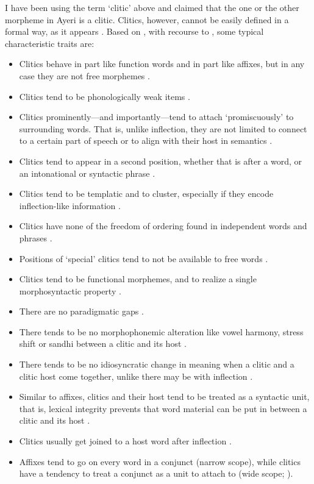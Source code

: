 I have been using the term `clitic' above and claimed that the one or the
other morpheme in Ayeri is a clitic. Clitics, however, cannot be easily defined
in a formal way, as it appears \citep[126]{spencerluis2012}. Based on
\citet{spencerluis2012}, with recourse to \citet{zwickypullum1983}, some
typical characteristic traits are:

\begin{itemize}
	\item Clitics behave in part like function words and in part like affixes, 
		but in any case they are not free morphemes 
		\citep[38, 42]{spencerluis2012}.
	\item Clitics tend to be phonologically weak items 
		\citep[39]{spencerluis2012}.
	\item Clitics prominently---and importantly---tend to attach 
		`promiscuously' to surrounding words. That is, unlike inflection, they 
		are not limited to connect to a certain part of speech or to align 
		with their host in semantics \citep[40, 108–109]{spencerluis2012}.
	\item Clitics tend to appear in a second position, whether that is after a 
		word, or an intonational or syntactic phrase 
		\citep[41]{spencerluis2012}.
	\item Clitics tend to be templatic and to cluster, especially if they 
		encode inflection-like information \citep[41, 47--48]{spencerluis2012}.
	\item Clitics have none of the freedom of ordering found in independent 
		words and phrases \citep[43]{spencerluis2012}.
	\item Positions of `special' clitics tend to not be available to free 
		words \citep[44]{spencerluis2012}.
	\item Clitics tend to be functional morphemes, and to realize a single 
		morphosyntactic property \citep[67, 179]{spencerluis2012}.
	\item There are no paradigmatic gaps \citep[108--109]{spencerluis2012}.
	\item There tends to be no morphophonemic alteration like vowel harmony, 
		stress shift or sandhi between a clitic and its host 
		\citep[108--109]{spencerluis2012}.
	\item There tends to be no idiosyncratic change in meaning when a clitic 
		and a clitic host come together, unlike there may be with inflection 
		\citep[108, 110]{spencerluis2012}.
	\item Similar to affixes, clitics and their host tend to be treated as a 
		syntactic unit, that is, lexical integrity prevents that word material
		can be put in between a clitic and its host 
		\citep[108, 110]{spencerluis2012}.
	\item Clitics usually get joined to a host word after inflection 
		\citep[108, 110]{spencerluis2012}.
	\item Affixes tend to go on every word in a conjunct (narrow scope), while 
		clitics have a tendency to treat a conjunct as a unit to attach to 
		(wide scope; \cite[139, 196\psqq]{spencerluis2012}).
\end{itemize}

